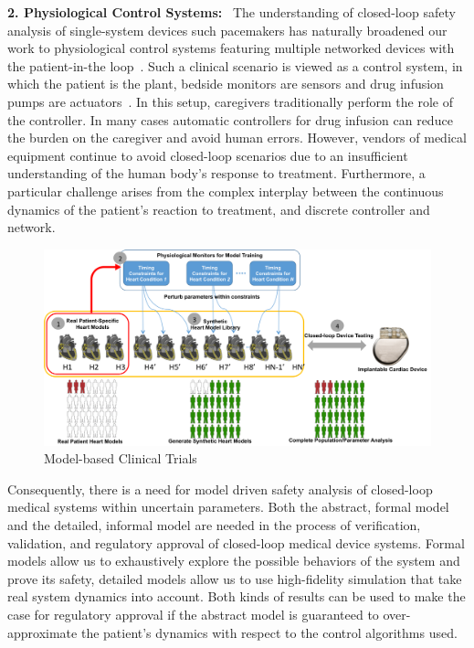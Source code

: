 \textbf{2. Physiological Control Systems:}
~The understanding of closed-loop safety analysis of single-system devices such pacemakers has naturally broadened our work to physiological control systems featuring multiple networked devices with the patient-in-the loop~\cite{pcs_iccps10}. Such a clinical scenario is viewed as a control system, in which the patient is the plant, bedside monitors are sensors and drug infusion pumps are actuators~\cite{hcmdss}.  In this setup, caregivers traditionally perform the role of the controller. In many cases automatic controllers for drug infusion can reduce the burden on the caregiver and avoid human errors. However, vendors of medical equipment continue to avoid closed-loop scenarios due to an insufficient understanding of the human body's response to treatment. Furthermore, a particular challenge arises from the complex interplay between the continuous dynamics of the patient's reaction to treatment, and discrete controller and network. 
\begin{figure}[!b]
	\centering
	\vspace{-10pt}
	\includegraphics[scale=0.3]{figs/mbct.png}
	\caption{\small Model-based Clinical Trials}
	\label{fig:mbct}
\end{figure}
Consequently, there is a need for model driven safety analysis of closed-loop medical systems within uncertain parameters. Both the abstract, formal model and the detailed, informal model are needed in the process of verification, validation, and regulatory approval of closed-loop medical device systems.  Formal models allow us to exhaustively explore the possible behaviors of the system and prove its safety, detailed models allow us to use high-fidelity simulation that take real system dynamics into account.  Both kinds of results can be used to make the case for regulatory approval if the abstract model is guaranteed to over-approximate the patient's dynamics with respect to the control algorithms used.\vspace{4pt}


